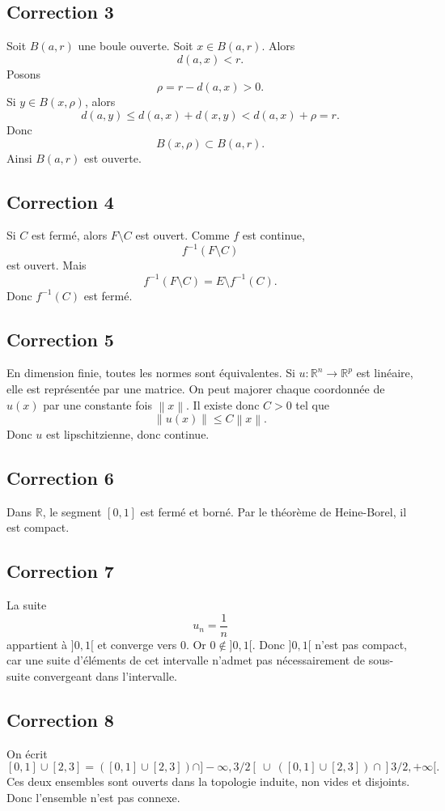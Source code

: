\documentclass[11pt,a4paper]{article}
\theoremstyle{definition}
\theoremstyle{plain}
\newcommand{\R}{\mathbb{R}}
\newcommand{\norme}[1]{\left\lVert #1 \right\rVert}
\begin{document}
\subsection*{Correction 3}
Soit $B(a,r)$ une boule ouverte.
Soit $x\in B(a,r)$.
Alors
\[
d(a,x)<r.
\]
Posons
\[
\rho=r-d(a,x)>0.
\]
Si $y\in B(x,\rho)$, alors
\[
d(a,y)\leq d(a,x)+d(x,y)<d(a,x)+\rho=r.
\]
Donc
\[
B(x,\rho)\subset B(a,r).
\]
Ainsi $B(a,r)$ est ouverte.

\subsection*{Correction 4}
Si $C$ est fermé, alors $F\setminus C$ est ouvert.
Comme $f$ est continue,
\[
f^{-1}(F\setminus C)
\]
est ouvert.
Mais
\[
f^{-1}(F\setminus C)=E\setminus f^{-1}(C).
\]
Donc $f^{-1}(C)$ est fermé.

\subsection*{Correction 5}
En dimension finie, toutes les normes sont équivalentes.
Si $u:\R^n\to\R^p$ est linéaire, elle est représentée par une matrice.
On peut majorer chaque coordonnée de $u(x)$ par une constante fois $\norme{x}$.
Il existe donc $C>0$ tel que
\[
\norme{u(x)}\leq C\norme{x}.
\]
Donc $u$ est lipschitzienne, donc continue.

\subsection*{Correction 6}
Dans $\R$, le segment $[0,1]$ est fermé et borné.
Par le théorème de Heine-Borel, il est compact.

\subsection*{Correction 7}
La suite
\[
u_n=\frac1n
\]
appartient à $]0,1[$ et converge vers $0$.
Or $0\notin ]0,1[$.
Donc $]0,1[$ n'est pas compact, car une suite d'éléments de cet intervalle n'admet pas nécessairement de sous-suite convergeant dans l'intervalle.

\subsection*{Correction 8}
On écrit
\[
[0,1]\cup[2,3]
=
\left([0,1]\cup[2,3]\right)\cap ]-\infty,3/2[
\ \cup\
\left([0,1]\cup[2,3]\right)\cap ]3/2,+\infty[.
\]
Ces deux ensembles sont ouverts dans la topologie induite, non vides et disjoints.
Donc l'ensemble n'est pas connexe.
\end{document}
